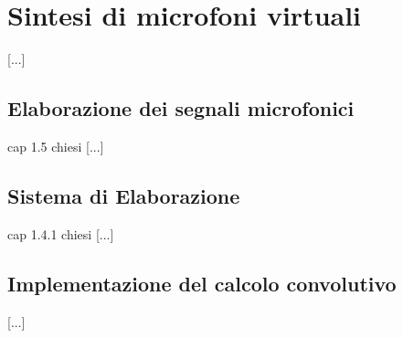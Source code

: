 \chapter{Sintesi di microfoni virtuali}
\label{sec:virtualmikes}
[...]\\


\section{Elaborazione dei segnali microfonici}
\label{sec:}
	
	cap 1.5 chiesi
	[...]\\

\section{Sistema di Elaborazione}
\label{sec:sistelab}
	
	cap 1.4.1 chiesi
	[...]\\
	
	
\section{Implementazione del calcolo convolutivo}
\label{sec:}
	[...]\\
	
